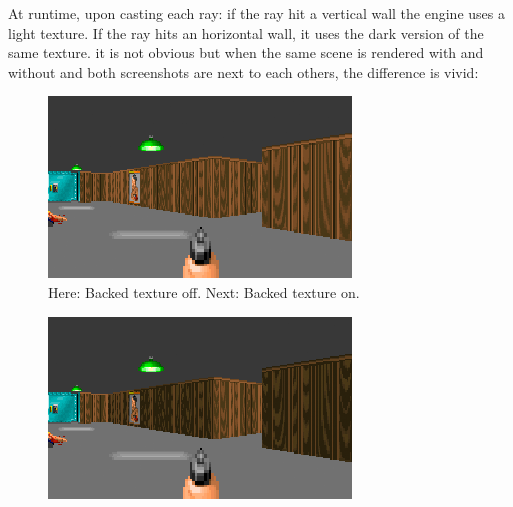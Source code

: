\par
At runtime, upon casting each ray: if the ray hit a vertical wall the engine uses a light texture. If the ray hits an horizontal wall, it uses the dark version of the same texture. it is not obvious but when the same scene is rendered with and without and both screenshots are next to each others, the difference is vivid:\\
\begin{minipage}{\textwidth}
\begin{figure}[H]
\centering
 \includegraphics[width=\textwidth]{screenshots/backed_off.png}
 \caption{Here: Backed texture off. Next: Backed texture on.}
 \end{figure}

\begin{figure}[H]
\centering
 \includegraphics[width=\textwidth]{screenshots/backed_on.png}
 
 \end{figure}
 \end{minipage}




